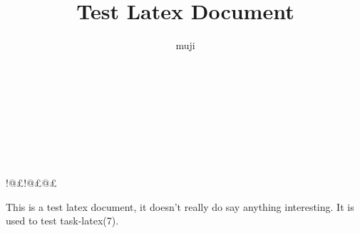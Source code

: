 \documentclass[a4paper,oneside,twocolumns]{article}
\title{Test Latex Document}
\author{muji}
\renewcommand{\paragraph}{\large}
\begin{document}
\fancyhead{}
\fancyfoot{}

\lfoot{\thepage}

\clearpage

\\\\\\\\\\\\\sfsdfsdf!@£!@£@£%

%
%

\paragraph{\normalsize{This is a test latex document, it doesn't really do say anything interesting. It is used to test task-latex(7).}}
\end{document}
